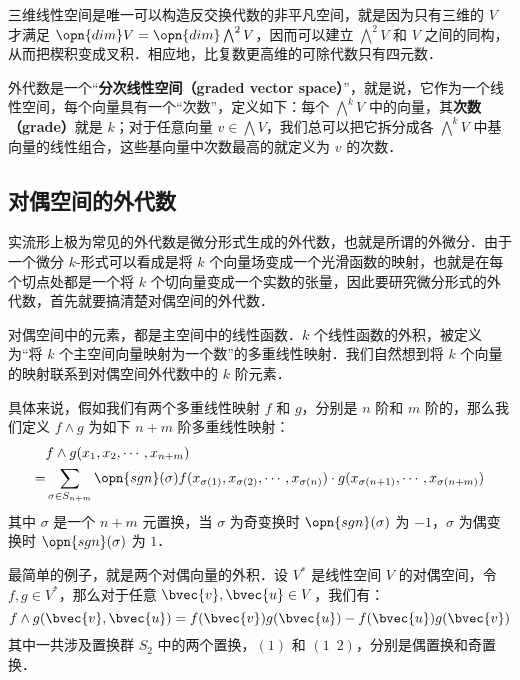 三维线性空间是唯一可以构造反交换代数的非平凡空间，就是因为只有三维的 $V$ 才满足 $\opn{dim}V=\opn{dim}\bigwedge^2V$，因而可以建立 $\bigwedge^2 V$ 和 $V$ 之间的同构，从而把楔积变成叉积．相应地，比复数更高维的可除代数只有四元数．

外代数是一个“\textbf{分次线性空间（graded vector space）}”，就是说，它作为一个线性空间，每个向量具有一个“次数”，定义如下：每个 $\bigwedge^kV$ 中的向量，其\textbf{次数（grade）}就是 $k$；对于任意向量 $v\in \bigwedge V$，我们总可以把它拆分成各 $\bigwedge^kV$ 中基向量的线性组合，这些基向量中次数最高的就定义为 $v$ 的次数．


\subsection{对偶空间的外代数}

实流形上极为常见的外代数是微分形式生成的外代数，也就是所谓的外微分．由于一个微分 $k$-形式可以看成是将 $k$ 个向量场变成一个光滑函数的映射，也就是在每个切点处都是一个将 $k$ 个切向量变成一个实数的张量，因此要研究微分形式的外代数，首先就要搞清楚对偶空间的外代数．

对偶空间中的元素，都是主空间中的线性函数．$k$ 个线性函数的外积，被定义为“将 $k$ 个主空间向量映射为一个数”的多重线性映射．我们自然想到将 $k$ 个向量的映射联系到对偶空间外代数中的 $k$ 阶元素．

具体来说，假如我们有两个多重线性映射 $f$ 和 $g$，分别是 $n$ 阶和 $m$ 阶的，那么我们定义 $f\wedge g$ 为如下 $n+m$ 阶多重线性映射：
\begin{equation}
\begin{aligned}
&f\wedge g(x_1, x_2, \cdots, x_{n+m})\\=
&\sum\limits_{\sigma\in S_{n+m}}\opn{sgn}(\sigma) f(x_{\sigma(1)}, x_{\sigma(2)}, \cdots, x_{\sigma(n)})\cdot g(x_{\sigma(n+1)}, \cdots, x_{\sigma(n+m)})
\end{aligned}
\end{equation}
其中 $\sigma$ 是一个 $n+m$ 元置换，当 $\sigma$ 为奇变换时 $\opn{sgn}(\sigma)$ 为 $-1$，$\sigma$ 为偶变换时 $\opn{sgn}(\sigma)$ 为 $1$．

最简单的例子，就是两个对偶向量的外积．设 $V^*$ 是线性空间 $V$ 的对偶空间，令 $f, g\in V^*$，那么对于任意 $\bvec{v}, \bvec{u}\in V$，我们有：
\begin{equation}
f\wedge g(\bvec{v}, \bvec{u})=f(\bvec{v})g(\bvec{u})-f(\bvec{u})g(\bvec{v})
\end{equation}
其中一共涉及置换群 $S_2$ 中的两个置换，$(1)$ 和 $(1\phantom{2}2)$，分别是偶置换和奇置换．

